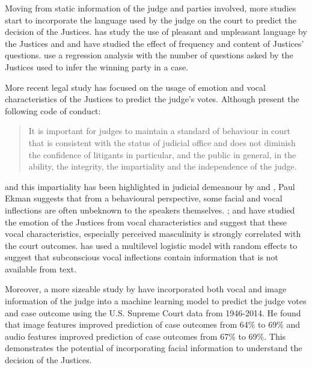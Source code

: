 \documentclass{monashthesis}
\begin{document}
Moving from static information of the judge and parties involved, more studies start to incorporate the language used by the judge on the court to predict the decision of the Justices. \textcite{black2011emotions} has study the use of pleasant and unpleasant language by the Justices and \textcite{Shullman2004illusion} and \textcite{johnson2009inquiring} have studied the effect of frequency and content of Justices' questions. \textcite{epstein2010inferring} use a regression analysis with the number of questions asked by the Justices used to infer the winning party in a case.

More recent legal study has focused on the usage of emotion and vocal characteristics of the Justices to predict the judge's votes. Although \textcite{judicalguid} present the following code of conduct:

\begin{quote}
It is important for judges to maintain a standard of behaviour in court that is consistent with the status of judicial office and does not diminish the confidence of litigants in particular, and the public in general, in the ability, the integrity, the impartiality and the independence of the judge.
\end{quote}

and this impartiality has been highlighted in judicial demeanour by \textcite{tutton2018judicial} and \textcite{goffman1956nature}, Paul Ekman \textcite{ekman1991invited} suggests that from a behavioural perspective, some facial and vocal inflections are often unbeknown to the speakers themselves. \textcite{chen2016perceived}; \textcite{chen2017covering} and \textcite{schubert1992observing} have studied the emotion of the Justices from vocal characteristics and suggest that these vocal characteristics, especially perceived masculinity is strongly correlated with the court outcomes. \textcite{dietrich2019emotional} has used a multilevel logistic model with random effects to suggest that subconscious vocal inflections contain information that is not available from text.

Moreover, a more sizeable study by \textcite{chen2018justice} have incorporated both vocal and image information of the judge into a machine learning model to predict the judge votes and case outcome using the U.S. Supreme Court data from 1946-2014. He found that image features improved prediction of case outcomes from 64\% to 69\% and audio features improved prediction of case outcomes from 67\% to 69\%. This demonstrates the potential of incorporating facial information to understand the decision of the Justices.
\end{document}
